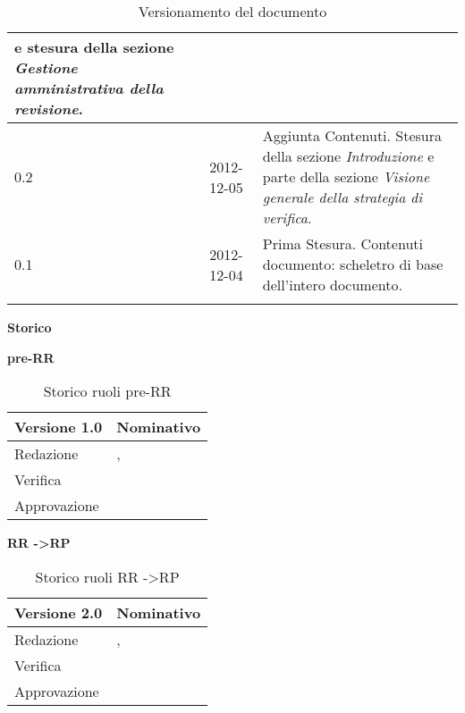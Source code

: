 \begin{longtable}{p{} p{} p{} p{}}
												e stesura della sezione \emph{Gestione amministrativa della revisione}.\\
	    \midrule
		    0.2		&	\FZ	&	2012-12-05			&	Aggiunta Contenuti.\newline
												Stesura della sezione \emph{Introduzione} e parte della sezione 
												\emph{Visione generale della strategia di verifica}.\\
	    \midrule
		    0.1		&	\AB	&	2012-12-04		&	Prima Stesura.\newline 
											Contenuti documento: scheletro di base dell'intero documento.\\
	    \bottomrule

	\caption{Versionamento del documento}
	\end{longtable}

\newpage

\Large{\textbf{Storico }}\\
\normalsize

\textbf{pre-RR}

\begin{table}[h]
\begin{center}

\begin{tabular}{p{} p{}}
\toprule
\textbf{Versione 1.0}	&	\textbf{Nominativo}\\
\midrule
\midrule
Redazione	&	\AB, \FZ \\
\midrule
Verifica &	\DC	\\
\midrule
Approvazione	&	\VP	\\
\bottomrule
\end{tabular}
\caption{Storico ruoli pre-RR}
\label{tabVers1}
\end{center}
\end{table}


\textbf{RR -\textgreater RP}

\begin{table}[h]
\begin{center}

\begin{tabular}{p{} p{}}
\toprule
\textbf{Versione 2.0}	&	\textbf{Nominativo}\\
\midrule
\midrule
Redazione	&	\EZ, \SL \\
\midrule
Verifica &	\DC	\\
\midrule
Approvazione	&	\FZ	\\
\bottomrule
\end{tabular}
\caption{Storico ruoli RR -\textgreater RP}
\label{tabVers1}
\end{center}
\end{table}

